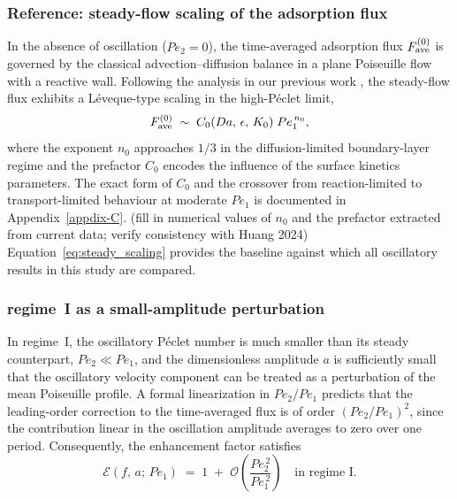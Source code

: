 \documentclass[lineno]{JFM-FLM_Au}
\begin{document}
\subsubsection{Reference: steady-flow scaling of the adsorption flux}
\label{sec:steady_recap}
 
In the absence of oscillation ($Pe_2 = 0$), the time-averaged adsorption
flux $F_{\rm ave}^{(0)}$ is governed by the classical
advection--diffusion balance in a plane Poiseuille flow with a reactive
wall. Following the analysis in our previous work \citep{Huang2024},
the steady-flow flux exhibits a L\'{e}veque-type scaling in the
high-P\'{e}clet limit,
\begin{equation}
F_{\rm ave}^{(0)} \;\sim\; C_{0}(Da,\,\epsilon,\,K_{0})\; Pe_{1}^{\,n_{0}},
\label{eq:steady_scaling}
\end{equation}
where the exponent $n_{0}$ approaches $1/3$ in the diffusion-limited
boundary-layer regime and the prefactor $C_{0}$ encodes the influence of
the surface kinetics parameters. The exact form of $C_{0}$ and the
crossover from reaction-limited to transport-limited behaviour at
moderate $Pe_{1}$ is documented in Appendix~\ref{appdix-C}.
{(fill in numerical values of $n_{0}$ and the prefactor extracted from current data; verify consistency with Huang 2024)}
Equation~\eqref{eq:steady_scaling} provides the baseline against which
all oscillatory results in this study are compared.
 
\subsubsection{regime~I as a small-amplitude perturbation}
\label{sec:regime_I_scaling}
 
In regime~I, the oscillatory P\'{e}clet number is much smaller than its
steady counterpart, $Pe_{2} \ll Pe_{1}$, and the dimensionless amplitude
$a$ is sufficiently small that the oscillatory velocity component can be
treated as a perturbation of the mean Poiseuille profile. A formal
linearization in $Pe_{2}/Pe_{1}$ predicts that the leading-order
correction to the time-averaged flux is of order
$(Pe_{2}/Pe_{1})^{2}$, since the contribution linear in the oscillation
amplitude averages to zero over one period. Consequently, the
enhancement factor satisfies
\begin{equation}
\mathcal{E}(f,\, a;\, Pe_{1}) \;=\; 1 \;+\; \mathcal{O}\!\left(
\frac{Pe_{2}^{\,2}}{Pe_{1}^{\,2}} \right)
\quad\text{in regime~I.}
\label{eq:regime_I_perturbation}
\end{equation}
 
\end{document}
